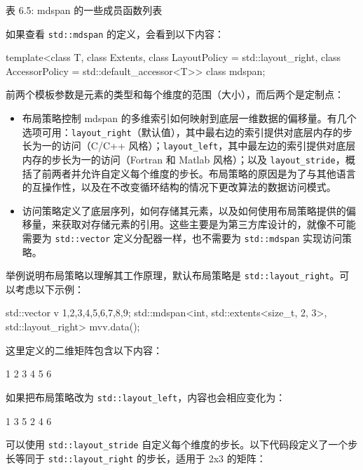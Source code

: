 \begin{center}
表 6.5: mdspan 的一些成员函数列表
\end{center}

如果查看 \verb|std::mdspan| 的定义，会看到以下内容：

\begin{cpp}
template<class T,
         class Extents,
         class LayoutPolicy = std::layout_right,
         class AccessorPolicy = std::default_accessor<T>>
class mdspan;
\end{cpp}

前两个模板参数是元素的类型和每个维度的范围（大小），而后两个是定制点：

\begin{itemize}
\item
布局策略控制 mdspan 的多维索引如何映射到底层一维数据的偏移量。有几个选项可用：\verb|layout_right|（默认值），其中最右边的索引提供对底层内存的步长为一的访问（C/C++ 风格）；\verb|layout_left|，其中最左边的索引提供对底层内存的步长为一的访问（Fortran 和 Matlab 风格）；以及 \verb|layout_stride|，概括了前两者并允许自定义每个维度的步长。布局策略的原因是为了与其他语言的互操作性，以及在不改变循环结构的情况下更改算法的数据访问模式。

\item
访问策略定义了底层序列，如何存储其元素，以及如何使用布局策略提供的偏移量，来获取对存储元素的引用。这些主要是为第三方库设计的，就像不可能需要为 \verb|std::vector| 定义分配器一样，也不需要为 \verb|std::mdspan| 实现访问策略。
\end{itemize}

举例说明布局策略以理解其工作原理，默认布局策略是 \verb|std::layout_right|。可以考虑以下示例：

\begin{cpp}
std::vector v {1,2,3,4,5,6,7,8,9};
std::mdspan<int,
            std::extents<size_t, 2, 3>,
            std::layout_right> mv{v.data()};
\end{cpp}

这里定义的二维矩阵包含以下内容：

\begin{shell}
1 2 3
4 5 6
\end{shell}

如果把布局策略改为 \verb|std::layout_left|，内容也会相应变化为：

\begin{shell}
1 3 5
2 4 6
\end{shell}

可以使用 \verb|std::layout_stride| 自定义每个维度的步长。以下代码段定义了一个步长等同于 \verb|std::layout_right| 的步长，适用于 2x3 的矩阵：


